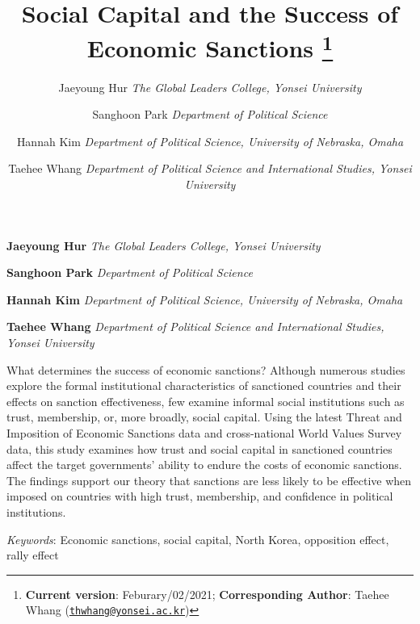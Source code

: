 \documentclass[12pt,]{article}
\title{Social Capital and the Success of Economic
Sanctions \thanks{\textbf{Current version}: Feburary/02/2021;
\textbf{Corresponding Author}: Taehee Whang
(\href{mailto:thwhang@yonsei.ac.kr}{\nolinkurl{thwhang@yonsei.ac.kr}})}  }
\author{\Large Jaeyoung Hur\vspace{0.05in} \newline\normalsize\emph{The
Global Leaders College, Yonsei University}   \and \Large Sanghoon
Park\vspace{0.05in} \newline\normalsize\emph{Department of Political
Science}   \and \Large Hannah
Kim\vspace{0.05in} \newline\normalsize\emph{Department of Political
Science, University of Nebraska, Omaha}   \and \Large Taehee
Whang\vspace{0.05in} \newline\normalsize\emph{Department of Political
Science and International Studies, Yonsei University}  }
\date{}
\newcommand*{\authorfont}{\fontfamily{phv}\selectfont}
\renewenvironment{abstract}
 {{%
    \setlength{\leftmargin}{0mm}
    \setlength{\rightmargin}{\leftmargin}%
  }%
  \relax}
 {\endlist}
\begin{document}
	
%    


{%
\setlength{\parindent}{0pt}
\thispagestyle{plain}
{\fontsize{18}{20}\selectfont\raggedright 
\maketitle  %

}

{
   \vskip 13.5pt\relax \normalsize\fontsize{11}{12} 
\textbf{\authorfont Jaeyoung Hur} \hskip 15pt \emph{\small The Global
Leaders College, Yonsei University}   \par \textbf{\authorfont Sanghoon
Park} \hskip 15pt \emph{\small Department of Political
Science}   \par \textbf{\authorfont Hannah
Kim} \hskip 15pt \emph{\small Department of Political Science,
University of Nebraska, Omaha}   \par \textbf{\authorfont Taehee
Whang} \hskip 15pt \emph{\small Department of Political Science and
International Studies, Yonsei University}   

}

}








\begin{abstract}

    \hbox{\vrule height .2pt width 39.14pc}

    \vskip 8.5pt %

\noindent What determines the success of economic sanctions? Although
numerous studies explore the formal institutional characteristics of
sanctioned countries and their effects on sanction effectiveness, few
examine informal social institutions such as trust, membership, or, more
broadly, social capital. Using the latest Threat and Imposition of
Economic Sanctions data and cross-national World Values Survey data,
this study examines how trust and social capital in sanctioned countries
affect the target governments' ability to endure the costs of economic
sanctions. The findings support our theory that sanctions are less
likely to be effective when imposed on countries with high trust,
membership, and confidence in political institutions.


\vskip 8.5pt \noindent \emph{Keywords}: Economic sanctions, social
capital, North Korea, opposition effect, rally effect \par

    \hbox{\vrule height .2pt width 39.14pc}



\end{abstract}
\end{document}
